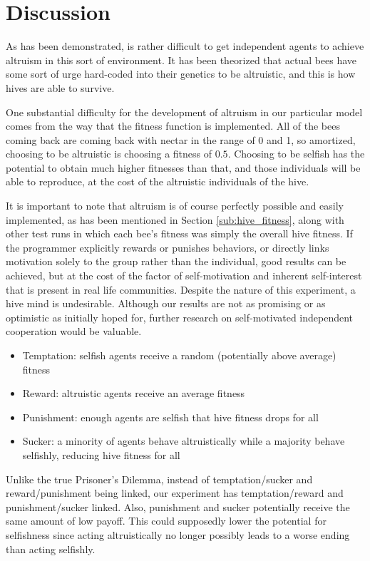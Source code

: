\documentclass[11pt]{article}
\begin{document}
	\FloatBarrier

	\section{Discussion} %
	\label{sec:discussion}

		As has been demonstrated, is rather difficult to get independent agents to achieve altruism in this sort of environment. It has been theorized that actual bees have some sort of urge hard-coded into their genetics to be altruistic, and this is how hives are able to survive. \cite{macy}

		One substantial difficulty for the development of altruism in our particular model comes from the way that the fitness function is implemented. All of the bees coming back are coming back with nectar in the range of 0 and 1, so amortized, choosing to be altruistic is choosing a fitness of $0.5$. Choosing to be selfish has the potential to obtain much higher fitnesses than that, and those individuals will be able to reproduce, at the cost of the altruistic individuals of the hive.

		It is important to note that altruism is of course perfectly possible and easily implemented, as has been mentioned in Section \ref{sub:hive_fitness}, along with other test runs in which each bee's fitness was simply the overall hive fitness. If the programmer explicitly rewards or punishes behaviors, or directly links motivation solely to the group rather than the individual, good results can be achieved, but at the cost of the factor of self-motivation and inherent self-interest that is present in real life communities. Despite the nature of this experiment, a hive mind is undesirable. Although our results are not as promising or as optimistic as initially hoped for, further research on self-motivated independent cooperation would be valuable. 

		\begin{itemize}
		\item Temptation: selfish agents receive a random (potentially above average) fitness
		\item Reward: altruistic agents receive an average fitness
		\item Punishment: enough agents are selfish that hive fitness drops for all
		\item Sucker: a minority of agents behave altruistically while a majority behave selfishly, reducing hive fitness for all
		\end{itemize}
		Unlike the true Prisoner's Dilemma, instead of temptation/sucker and reward/punishment being linked, our experiment has temptation/reward and punishment/sucker linked. Also, punishment and sucker potentially receive the same amount of low payoff. This could supposedly lower the potential for selfishness since acting altruistically no longer possibly leads to a worse ending than acting selfishly.



	\nocite{*}
	
	
\end{document}
